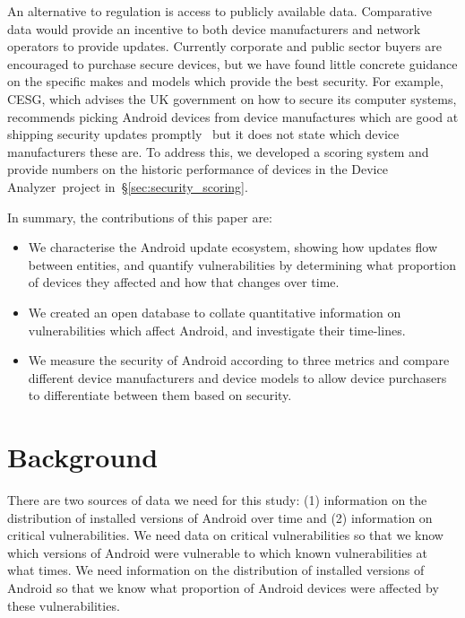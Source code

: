 \documentclass[conference,a4paper,twoside]{IEEEtran}
\newcommand{\da}{Device Analyzer}
\begin{document}
An alternative to regulation is access to publicly available data. 
Comparative data would provide an incentive to both device manufacturers and network operators to provide updates.
Currently corporate and public sector buyers are encouraged to purchase secure devices, but we have found little concrete guidance on the specific makes and models which provide the best security. 
For example, CESG, which advises the UK government on how to secure its computer systems, recommends picking Android devices from device manufactures which are good at shipping security updates promptly~\cite{CESG2013} but it does not state which device manufacturers these are.
To address this, we developed a scoring system and provide numbers on the historic performance of devices in the \da\ project in~\S\ref{sec:security_scoring}.

%

In summary, the contributions of this paper are:
\begin{itemize}
 \item We characterise the Android update ecosystem, showing how updates flow between entities, and quantify vulnerabilities by determining what proportion of devices they affected and how that changes over time.
 \item We created an open database to collate quantitative information on vulnerabilities which affect Android, and investigate their time-lines.
 \item We measure the security of Android according to three metrics and compare different device manufacturers and device models to allow device purchasers to differentiate between them based on security.
\end{itemize}

\section{Background}
\label{sec:background}
There are two sources of data we need for this study: (1) information on the distribution of installed versions of Android over time and (2) information on critical vulnerabilities.
We need data on critical vulnerabilities so that we know which versions of Android were vulnerable to which known vulnerabilities at what times.
We need information on the distribution of installed versions of Android so that we know what proportion of Android devices were affected by these vulnerabilities.
\end{document}
